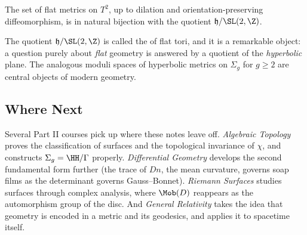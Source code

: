 \begin{theorem}
    The set of flat metrics on $T^2$, up to dilation and orientation-preserving diffeomorphism, is in natural bijection with the quotient $\mathfrak{h} / \SL(2, \Z)$.
\end{theorem}

The quotient $\mathfrak{h}/\SL(2,\Z)$ is called the  of flat tori, and it is a remarkable object: a question purely about \emph{flat} geometry is answered by a quotient of the \emph{hyperbolic} plane. The analogous moduli spaces of hyperbolic metrics on $\Sigma_g$ for $g \geq 2$ are central objects of modern geometry.

\subsection*{Where Next}

Several Part II courses pick up where these notes leave off. \emph{Algebraic Topology} proves the classification of surfaces and the topological invariance of $\chi$, and constructs $\Sigma_g = \HH/\Gamma$ properly. \emph{Differential Geometry} develops the second fundamental form further (the trace of $Dn$, the mean curvature, governs soap films as the determinant governs Gauss--Bonnet). \emph{Riemann Surfaces} studies surfaces through complex analysis, where $\Mob(D)$ reappears as the automorphism group of the disc. And \emph{General Relativity} takes the idea that geometry is encoded in a metric and its geodesics, and applies it to spacetime itself.

